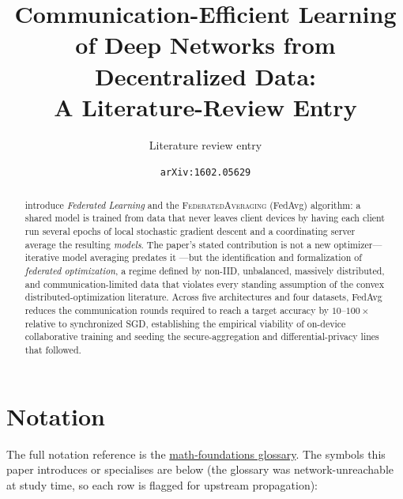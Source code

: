 \documentclass[11pt]{article}
\title{Communication-Efficient Learning of Deep Networks from Decentralized Data:\\ A Literature-Review Entry}
\author{Literature review entry}
\date{\texttt{arXiv:1602.05629}}
\begin{document}
\maketitle

\begin{abstract}
\citet{mcmahan2017fedavg} introduce \emph{Federated Learning} and the \textsc{FederatedAveraging} (FedAvg) algorithm: a shared model is trained from data that never leaves client devices by having each client run several epochs of local stochastic gradient descent and a coordinating server average the resulting \emph{models}. The paper's stated contribution is not a new optimizer---iterative model averaging predates it \citep{mcdonald2010distributed,povey2015parallel,zhang2015elastic}---but the identification and formalization of \emph{federated optimization}, a regime defined by non-IID, unbalanced, massively distributed, and communication-limited data that violates every standing assumption of the convex distributed-optimization literature. Across five architectures and four datasets, FedAvg reduces the communication rounds required to reach a target accuracy by $10$--$100\times$ relative to synchronized SGD, establishing the empirical viability of on-device collaborative training and seeding the secure-aggregation and differential-privacy lines that followed.
\end{abstract}

\section*{Notation}

The full notation reference is the
\href{https://github.com/pleyva2004/math-foundations/blob/main/notation.pdf}{math-foundations glossary}.
The symbols this paper introduces or specialises are below (the glossary was network-unreachable at study time, so each row is flagged for upstream propagation):
\end{document}
